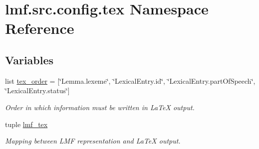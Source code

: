 \hypertarget{namespacelmf_1_1src_1_1config_1_1tex}{\section{lmf.\+src.\+config.\+tex Namespace Reference}
\label{namespacelmf_1_1src_1_1config_1_1tex}
}
\subsection*{Variables}
\begin{DoxyCompactItemize}
\item 
list \hyperlink{namespacelmf_1_1src_1_1config_1_1tex_a19c5578c65b152e179d23ea103849590}{tex\+\_\+order} = \mbox{[}\char`\"{}Lemma.\+lexeme\char`\"{}, \char`\"{}Lexical\+Entry.\+id\char`\"{}, \char`\"{}Lexical\+Entry.\+part\+Of\+Speech\char`\"{}, \char`\"{}Lexical\+Entry.\+status\char`\"{}\mbox{]}
\begin{DoxyCompactList}\small\item\em Order in which information must be written in La\+Te\+X output. \end{DoxyCompactList}\item 
tuple \hyperlink{namespacelmf_1_1src_1_1config_1_1tex_aee96ffe8f8f1e7f54b1c9fa55d93010d}{lmf\+\_\+tex}
\begin{DoxyCompactList}\small\item\em Mapping between L\+M\+F representation and La\+Te\+X output. \end{DoxyCompactList}\end{DoxyCompactItemize}


